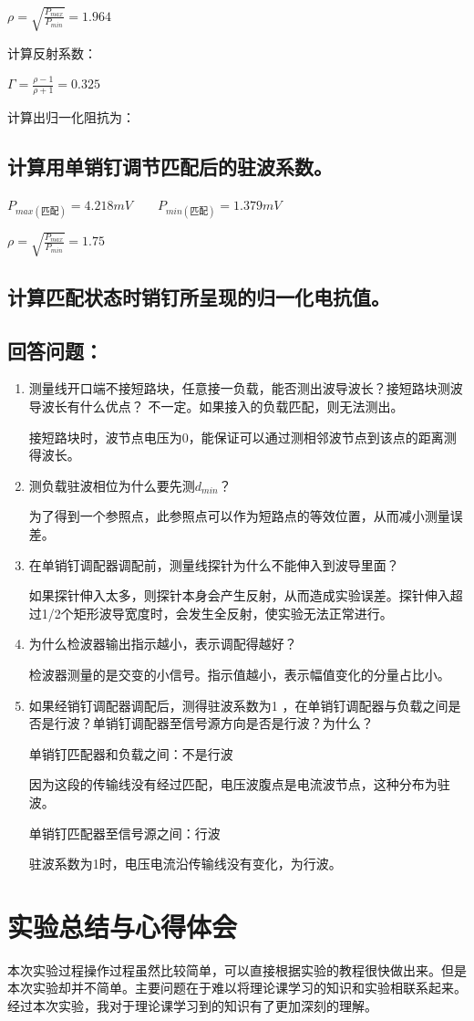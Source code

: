 \documentclass{../source/Experiment}
\begin{document}
        $\rho = \sqrt{\displaystyle \frac{P_{max}}{P_{min}}} = 1.964$

        计算反射系数：

        $\Gamma = \displaystyle \frac{\rho-1}{\rho+1} = 0.325$

        计算出归一化阻抗为：


        \subsection{计算用单销钉调节匹配后的驻波系数。}
        $P_{max(\mbox{匹配})} = 4.218mV\qquad P_{min(\mbox{匹配})} = 1.379mV\qquad$

        $\rho = \sqrt{\displaystyle \frac{P_{max}}{P_{min}}} = 1.75$

        \subsection{计算匹配状态时销钉所呈现的归一化电抗值。}



        \subsection{回答问题：}
            \begin{enumerate}
                \item 测量线开口端不接短路块，任意接一负载，能否测出波导波长？接短路块测波导波长有什么优点？
                不一定。如果接入的负载匹配，则无法测出。\par 
            接短路块时，波节点电压为0，能保证可以通过测相邻波节点到该点的距离测得波长。
                \item 测负载驻波相位为什么要先测$d_{min}$？
                
                为了得到一个参照点，此参照点可以作为短路点的等效位置，从而减小测量误差。
                \item 在单销钉调配器调配前，测量线探针为什么不能伸入到波导里面？
                
                如果探针伸入太多，则探针本身会产生反射，从而造成实验误差。探针伸入超过1/2个矩形波导宽度时，会发生全反射，使实验无法正常进行。
                \item 为什么检波器输出指示越小，表示调配得越好？
                
                检波器测量的是交变的小信号。指示值越小，表示幅值变化的分量占比小。
                \item 如果经销钉调配器调配后，测得驻波系数为1 ，在单销钉调配器与负载之间是否是行波？单销钉调配器至信号源方向是否是行波？为什么？

                单销钉匹配器和负载之间：不是行波
                
                因为这段的传输线没有经过匹配，电压波腹点是电流波节点，这种分布为驻波。
    
                单销钉匹配器至信号源之间：行波
                
                驻波系数为1时，电压电流沿传输线没有变化，为行波。
                

            \end{enumerate}
    \section{实验总结与心得体会}
        本次实验过程操作过程虽然比较简单，可以直接根据实验的教程很快做出来。但是本次实验却并不简单。主要问题在于难以将理论课学习的知识和实验相联系起来。经过本次实验，我对于理论课学习到的知识有了更加深刻的理解。
\end{document}
